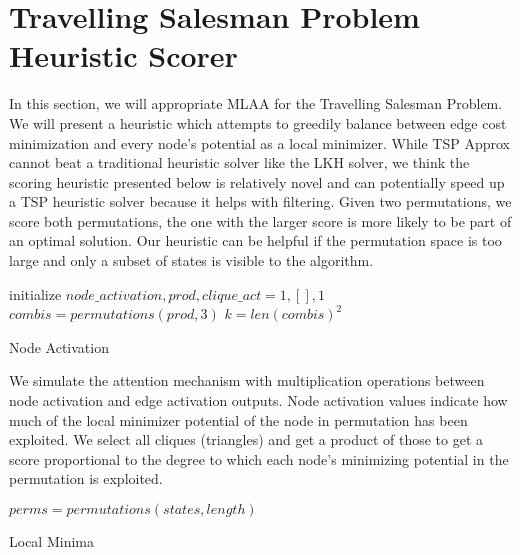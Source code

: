 \documentclass[10pt, conference, compsocconf]{IEEEtran}
\begin{document}
\section{Travelling Salesman Problem Heuristic Scorer}
In this section, we will appropriate MLAA for the Travelling Salesman Problem. We will present a heuristic which attempts to greedily balance between edge cost minimization and every node's potential as a local minimizer. While {\sc TSP Approx} cannot beat a traditional heuristic solver like the LKH solver, we think the scoring heuristic presented below is relatively novel and can potentially speed up a TSP heuristic solver because it helps with filtering. Given two permutations, we score both permutations, the one with the larger score is more likely to be part of an optimal solution. Our heuristic can be helpful if the permutation space is too large and only a subset of states is visible to the algorithm.

\begin{algorithm}[h]
initialize $node\_activation, prod, clique\_act = 1, [],1 $\;
$combis = permutations(prod, 3)$ \;
$k = len(combis)^2$ \;
\caption{{\sc Node Activation}}
\label{algo:arch_template3}
\end{algorithm}

We simulate the attention mechanism with multiplication operations between node activation and edge activation outputs. Node activation values indicate how much of the local minimizer potential of the node in permutation has been exploited. We select all cliques (triangles) and get a product of those to get a score proportional to the degree to which each node's minimizing potential in the permutation is exploited.

\begin{algorithm}[h]
$perms = permutations(states, length)$ \;
\caption{{\sc Local Minima}}
\label{algo:arch_template4}
\end{algorithm}
\end{document}
